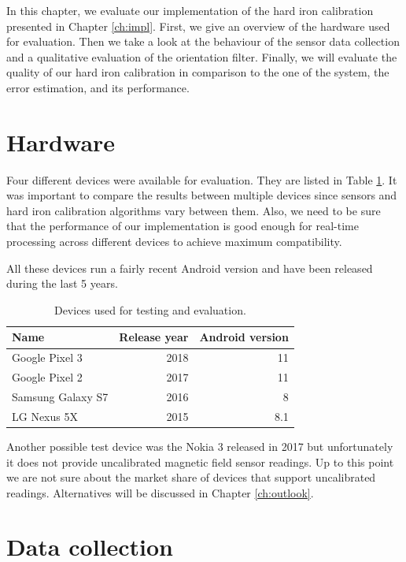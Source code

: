 
In this chapter, we evaluate our implementation of the hard iron calibration presented in Chapter \ref{ch:impl}. First, we give an overview of the hardware used for evaluation. Then we take a look at the behaviour of the sensor data collection and a qualitative evaluation of the orientation filter. Finally, we will evaluate the quality of our hard iron calibration in comparison to the one of the system, the error estimation, and its performance.

\section{Hardware}

Four different devices were available for evaluation. They are listed in Table \ref{tbl:hardware}. It was important to compare the results between multiple devices since sensors and hard iron calibration algorithms vary between them. Also, we need to be sure that the performance of our implementation is good enough for real-time processing across different devices to achieve maximum compatibility.

All these devices run a fairly recent Android version and have been released during the last 5 years.

\begin{table}[h]
    \centering
    \begin{tabular}{ | l | r | r | }
    \hline
    \textbf{Name}     & \textbf{Release year} & \textbf{Android version} \\ \hline
    Google Pixel 3    & 2018 & 11 \\ \hline
    Google Pixel 2    & 2017 & 11 \\ \hline
    Samsung Galaxy S7 & 2016 & 8 \\ \hline
    LG Nexus 5X       & 2015 & 8.1 \\ \hline
    \end{tabular}
    \caption{Devices used for testing and evaluation.}
    \label{tbl:hardware}
\end{table}

Another possible test device was the Nokia 3 released in 2017 but unfortunately it does not provide uncalibrated magnetic field sensor readings. Up to this point we are not sure about the market share of devices that support uncalibrated readings. Alternatives will be discussed in Chapter \ref{ch:outlook}.

\section{Data collection}
\label{sec:eval_sensor}

